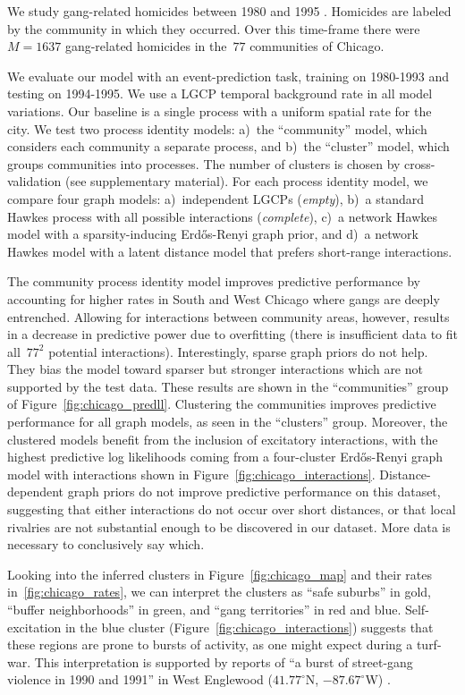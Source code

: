 We study gang-related homicides between 1980 and 1995
\cite{ICPSR}. Homicides are labeled by the community in which they
occurred. Over this time-frame there were~${M=1637}$ gang-related
homicides in the~${77}$ communities of Chicago.

We evaluate our model with an event-prediction task, training on
1980-1993 and testing on 1994-1995. We use a LGCP temporal background
rate in all model variations. Our baseline is a single process with a
uniform spatial rate for the city.  We test two process identity
models: a)~the ``community'' model, which considers each community a
separate process, and b)~the ``cluster'' model, which groups
communities into processes. The number of clusters is chosen by
cross-validation (see supplementary material). For each process
identity model, we compare four graph models: a)~independent LGCPs
(\emph{empty}), b)~a standard Hawkes process with all possible
interactions (\emph{complete}), c)~a network Hawkes model with a
sparsity-inducing Erd\H{o}s-Renyi graph prior, and d)~a network Hawkes
model with a latent distance model that prefers short-range
interactions.

The community process identity model improves predictive performance
by accounting for higher rates in South and West Chicago where gangs
are deeply entrenched. Allowing for interactions between community
areas, however, results in a decrease in predictive power due to
overfitting (there is insufficient data to fit all~${77^2}$ potential
interactions). Interestingly, sparse graph priors do not help. They
bias the model toward sparser but stronger interactions which are not
supported by the test data. These results are shown in the
``communities'' group of Figure~\ref{fig:chicago_predll}. Clustering
the communities improves predictive performance for all graph models,
as seen in the ``clusters'' group. Moreover, the clustered models
benefit from the inclusion of excitatory interactions, with the
highest predictive log likelihoods coming from a four-cluster
Erd\H{o}s-Renyi graph model with interactions shown in
Figure~\ref{fig:chicago_interactions}. Distance-dependent graph priors
do not improve predictive performance on this dataset, suggesting that
either interactions do not occur over short distances, or that local
rivalries are not substantial enough to be discovered in our
dataset. More data is necessary to conclusively say which.

Looking into the inferred clusters in Figure~\ref{fig:chicago_map} and
their rates in~\ref{fig:chicago_rates}, we can interpret the clusters
as ``safe suburbs'' in gold, ``buffer neighborhoods'' in green, and
``gang territories'' in red and blue. Self-excitation in the blue
cluster (Figure~\ref{fig:chicago_interactions}) suggests that these
regions are prone to bursts of activity, as one might expect during a
turf-war. This interpretation is supported by reports of ``a burst of
street-gang violence in 1990 and 1991'' in West Englewood
(${41.77^\circ}$N, ${-87.67^\circ}$W) \cite{Block-1993}.

